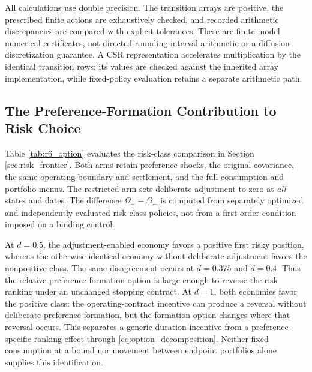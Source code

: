 All calculations use double precision. The transition arrays are positive, the prescribed finite actions are exhaustively checked, and recorded arithmetic discrepancies are compared with explicit tolerances. These are finite-model numerical certificates, not directed-rounding interval arithmetic or a diffusion discretization guarantee. A CSR representation accelerates multiplication by the identical transition rows; its values are checked against the inherited array implementation, while fixed-policy evaluation retains a separate arithmetic path.

\subsection{The Preference-Formation Contribution to Risk Choice}
\label{sec:r6_mechanism_evidence}
Table \ref{tab:r6_option} evaluates the risk-class comparison in Section \ref{sec:risk_frontier}. Both arms retain preference shocks, the original covariance, the same operating boundary and settlement, and the full consumption and portfolio menus. The restricted arm sets deliberate adjustment to zero at \emph{all} states and dates. The difference $\Omega_+-\Omega_-$ is computed from separately optimized and independently evaluated risk-class policies, not from a first-order condition imposed on a binding control.

At $d=0.5$, the adjustment-enabled economy favors a positive first risky position, whereas the otherwise identical economy without deliberate adjustment favors the nonpositive class. The same disagreement occurs at $d=0.375$ and $d=0.4$. Thus the relative preference-formation option is large enough to reverse the risk ranking under an unchanged stopping contract. At $d=1$, both economies favor the positive class: the operating-contract incentive can produce a reversal without deliberate preference formation, but the formation option changes where that reversal occurs. This separates a generic duration incentive from a preference-specific ranking effect through \eqref{eq:option_decomposition}. Neither fixed consumption at a bound nor movement between endpoint portfolios alone supplies this identification.

